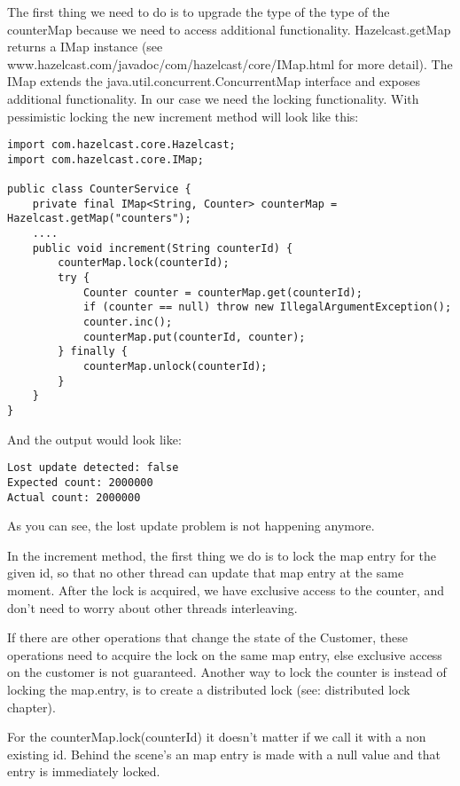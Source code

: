 The first thing we need to do is to upgrade the type of the type of the counterMap because we need to access additional functionality. Hazelcast.getMap returns a IMap instance (see www.hazelcast.com/javadoc/com/hazelcast/core/IMap.html for more detail). The IMap extends the java.util.concurrent.ConcurrentMap interface and exposes additional functionality. In our case we need the locking functionality. With pessimistic locking the new increment method will look like this:

\begin{verbatim}
import com.hazelcast.core.Hazelcast;
import com.hazelcast.core.IMap;

public class CounterService {
    private final IMap<String, Counter> counterMap = Hazelcast.getMap("counters");
    ....
    public void increment(String counterId) {
        counterMap.lock(counterId);
        try {
            Counter counter = counterMap.get(counterId);
            if (counter == null) throw new IllegalArgumentException();
            counter.inc();
            counterMap.put(counterId, counter);
        } finally {
            counterMap.unlock(counterId);
        }
    }
}
\end{verbatim}

And the output would look like:

\begin{verbatim}
Lost update detected: false
Expected count: 2000000
Actual count: 2000000
\end{verbatim}

As you can see, the lost update problem is not happening anymore.

In the increment method, the first thing we do is to lock the map entry for the given id, so that no other thread can update that map entry at the same moment. After the lock is acquired, we have exclusive access to the counter, and don't need to worry about other threads interleaving. 

If there are other operations that change the state of the Customer, these operations need to acquire the lock on the same map entry, else exclusive access on the customer is not guaranteed. Another way to lock the counter is instead of locking the map.entry, is to create a distributed lock (see: distributed lock chapter). 

For the counterMap.lock(counterId) it doesn't matter if we call it with a non existing id. Behind the scene's an map entry is made with a null value and that entry is immediately locked.

